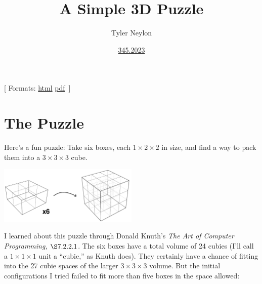 \documentclass[
]{article}
\title{A Simple 3D Puzzle}
\author{Tyler Neylon}
\date{\href{https://tylerneylon.com/a/7date/}{345.2023}}
\newcommand{\class}[1]{}
\newcommand{\optquad}{\quad}
\newcommand{\smallscrneg}{}
\newcommand{\smallscr}[1]{}
\newcommand{\bigscr}[1]{#1}
\newcommand{\smallscrskip}[1]{}
\begin{document}
\maketitle

\newcommand{\R}{\mathbb{R}}
\newcommand{\N}{\mathbb{N}}
\newcommand{\eqnset}[1]{\left.\mbox{$#1$}\;\;\right\rbrace\class{postbrace}{ }}
\providecommand{\latexonlyrule}[3][]{}
\providecommand{\optquad}{\class{optquad}{}}
\providecommand{\smallscrneg}{\class{smallscrneg}{ }}
\providecommand{\bigscr}[1]{\class{bigscr}{#1}}
\providecommand{\smallscr}[1]{\class{smallscr}{#1}}
\providecommand{\smallscrskip}[1]{\class{smallscrskip}{\hskip #1}}

\newcommand{\mydots}{{\cdot}\kern -0.1pt{\cdot}\kern -0.1pt{\cdot}}

\newcommand{\?}{\stackrel{?}{=}}
\newcommand{\sign}{\textsf{sign}}
\newcommand{\order}{\textsf{order}}
\newcommand{\flips}{\textsf{flips}}
\newcommand{\samecycles}{\textsf{same$\\\_$cycles}}
\newcommand{\canon}{\textsf{canon}}
\newcommand{\cs}{\mathsf{cs}}
\newcommand{\dist}{\mathsf{dist}}
\renewcommand{\theenumi}{(\roman{enumi})}

{[} Formats:
\href{http://tylerneylon.com/a/lego_puzzle/lego_puzzle.html}{html}
\textbar{}
\href{http://tylerneylon.com/a/lego_puzzle/lego_puzzle.pdf}{pdf}
\(\,\){]}

\hypertarget{the-puzzle}{%
\section{The Puzzle}\label{the-puzzle}}

Here's a fun puzzle: Take six boxes, each \(1\times 2\times 2\) in size,
and find a way to pack them into a \(3\times 3\times 3\) cube.

\begin{center}\includegraphics[width=0.5\textwidth]{img/img1.pdf}\end{center}

I learned about this puzzle through Donald Knuth's \emph{The Art of
Computer Programming,} \(\S 7.2.2.1\). The six boxes have a total volume
of 24 cubies (I'll call a \(1\times 1\times 1\) unit a ``cubie,'' as
Knuth does). They certainly have a chance of fitting into the 27 cubie
spaces of the larger \(3\times 3\times 3\) volume. But the initial
configurations I tried failed to fit more than five boxes in the space
allowed:
\end{document}

